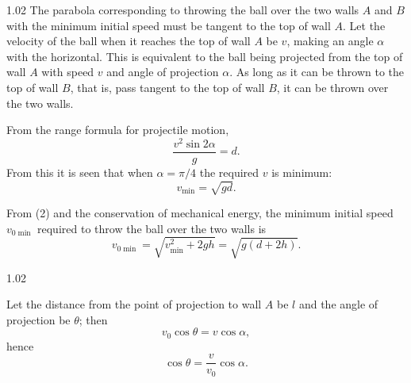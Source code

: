\begin{solution}{1.02}
The parabola corresponding to throwing the ball over the two walls $A$ and $B$ with the minimum
initial speed must be tangent to the top of wall $A$. Let the velocity of the ball when it
reaches the top of wall $A$ be $v$, making an angle $\alpha$ with the horizontal. This is
equivalent to the ball being projected from the top of wall $A$ with speed $v$ and angle of
projection $\alpha$. As long as it can be thrown to the top of wall $B$, that is, pass tangent
to the top of wall $B$, it can be thrown over the two walls.

From the range formula for projectile motion,
\begin{equation}
\frac{v^2\sin 2\alpha}{g} = d. \tag{1}
\end{equation}
From this it is seen that when $\alpha=\pi/4$ the required $v$ is minimum:
\begin{equation}
v_{\min} = \sqrt{gd}. \tag{2}
\end{equation}

From (2) and the conservation of mechanical energy, the minimum initial speed $v_{0\min}$
required to throw the ball over the two walls is
\begin{equation}
v_{0\min} = \sqrt{v_{\min}^2+2gh} = \sqrt{g(d+2h)}. \tag{3}
\end{equation}

\begin{figbox}{1.02}
\end{figbox}

Let the distance from the point of projection to wall $A$ be $l$ and the angle of projection be
$\theta$; then
\begin{equation*}
v_0\cos\theta = v\cos\alpha,
\end{equation*}
hence
\begin{equation}
\cos\theta = \frac{v}{v_0}\cos\alpha. \tag{4}
\end{equation}


\end{solution}
